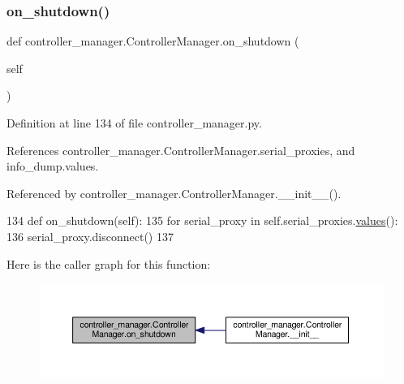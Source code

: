 \subsubsection{\texorpdfstring{on\+\_\+shutdown()}{on\_shutdown()}}
{\footnotesize\ttfamily def controller\+\_\+manager.\+Controller\+Manager.\+on\+\_\+shutdown (\begin{DoxyParamCaption}\item[{}]{self }\end{DoxyParamCaption})}



Definition at line 134 of file controller\+\_\+manager.\+py.



References controller\+\_\+manager.\+Controller\+Manager.\+serial\+\_\+proxies, and info\+\_\+dump.\+values.



Referenced by controller\+\_\+manager.\+Controller\+Manager.\+\_\+\+\_\+init\+\_\+\+\_\+().


\begin{DoxyCode}
134     \textcolor{keyword}{def }on\_shutdown(self):
135         \textcolor{keywordflow}{for} serial\_proxy \textcolor{keywordflow}{in} self.serial\_proxies.\hyperlink{namespaceinfo__dump_a519d64383e606d3ddaff0c01f233d087}{values}():
136             serial\_proxy.disconnect()
137 
\end{DoxyCode}
Here is the caller graph for this function\+:
\nopagebreak
\begin{figure}[H]
\begin{center}
\leavevmode
\includegraphics[width=350pt]{dd/da8/classcontroller__manager_1_1_controller_manager_a0d85576b1fbfd7e7e8361ce3d4518920_icgraph}
\end{center}
\end{figure}
\mbox{\label{classcontroller__manager_1_1_controller_manager_a732d60e383dbfd284d1f441e8f065b1b}} 
